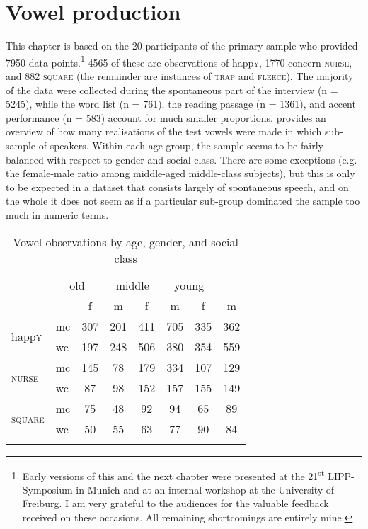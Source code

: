 \chapter{Vowel production}
\label{ch.prod_results_vow}

This chapter is based on the 20 participants of the primary sample who provided 7950 data points.\footnote{Early versions of this and the next chapter were presented at the 21\textsuperscript{st} LIPP-Symposium in Munich and at an internal workshop at the University of Freiburg. I am very grateful to the audiences for the valuable feedback received on these occasions. All remaining shortcomings are entirely mine.}
4565 of these are observations of happ\textsc{y}, 1770 concern \textsc{nurse}, and 882 \textsc{square} (the remainder are instances of \textsc{trap} and \textsc{fleece}).
The majority of the data were collected during the spontaneous part of the interview (n = 5245), while the word list (n = 761), the reading passage (n = 1361), and accent performance (n = 583) account for much smaller proportions.
 provides an overview of how many realisations of the test vowels were made in which sub-sample of speakers.
Within each age group, the sample seems to be fairly balanced with respect to gender and social class.
There are some exceptions (e.g. the female-male ratio among middle-aged middle-class subjects), but this is only to be expected in a dataset that consists largely of spontaneous speech, and on the whole it does not seem as if a particular sub-group dominated the sample too much in numeric terms.

\begin{table}
	
	\caption{Vowel observations by age, gender, and social class}
	\label{tab.vowels.n.observations}
	\begin{tabular}{llcccccc}
		\lsptoprule
		\multicolumn{2}{c}{} & \multicolumn{2}{c}{old} & \multicolumn{2}{c}{middle} & \multicolumn{2}{c}{young}\\
		& & f & m & f & m & f & m\\
		\midrule
		\multirow{2}{*}{happ\textsc{y}} & mc & 307 & 201 & 411 & 705 & 335 & 362\\
		& wc & 197 & 248 & 506 & 380 & 354 & 559\\
		\multirow{2}{*}{\textsc{nurse}} & mc & 145 & 78 & 179 & 334 & 107 & 129\\
		& wc & 87 & 98 & 152 & 157 & 155 & 149\\
		\multirow{2}{*}{\textsc{square}} & mc & 75 & 48 & 92 & 94 & 65 & 89\\
		& wc & 50 & 55 & 63 & 77 & 90 & 84\\
		\lspbottomrule
	\end{tabular}
\end{table}

